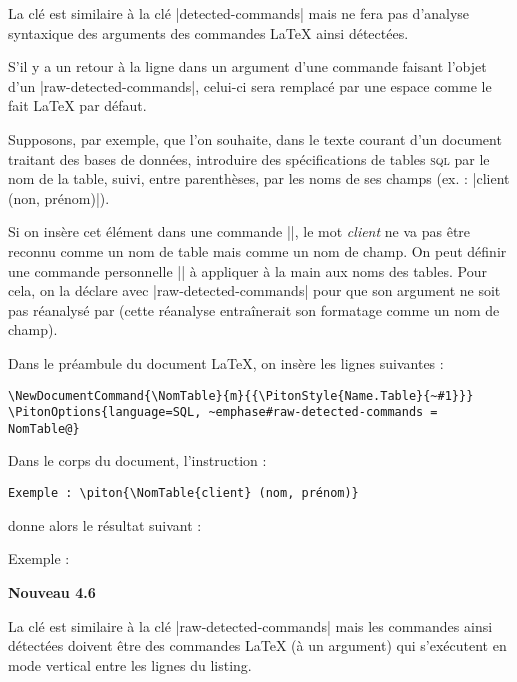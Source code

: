 \documentclass[dvipsnames,svgnames]{article}
\begin{document}
\bigskip
La clé  est similaire à la clé |detected-commands| mais
 ne fera pas d'analyse syntaxique des arguments des commandes LaTeX ainsi
détectées.

S'il y a un retour à la ligne dans un argument d'une commande faisant l'objet d'un
|raw-detected-commands|, celui-ci sera remplacé par une espace comme le fait LaTeX par
défaut. 

\medskip
Supposons, par exemple, que l'on souhaite, dans le texte courant d'un document
traitant des bases de données, introduire des spécifications de tables
\textsc{sql} par le nom de la table, suivi, entre parenthèses, par les noms de
ses champs (ex. : |client (non, prénom)|).

Si on insère cet élément dans une commande |\piton|, le mot \emph{client} ne va pas
être reconnu comme un nom de table mais comme un nom de champ. On peut définir
une commande personnelle |\NomTable|
à appliquer à la main aux noms des tables. Pour cela, on la déclare avec
|raw-detected-commands| pour que son argument ne soit pas réanalysé par 
(cette réanalyse entraînerait son formatage comme un nom de champ).


\medskip
Dans le préambule du document LaTeX, on insère les lignes suivantes :
\begin{Verbatim}
\NewDocumentCommand{\NomTable}{m}{{\PitonStyle{Name.Table}{~#1}}}
\PitonOptions{language=SQL, ~emphase#raw-detected-commands = NomTable@}
\end{Verbatim}

Dans le corps du document, l'instruction :

\begin{Verbatim}
Exemple : \piton{\NomTable{client} (nom, prénom)}
\end{Verbatim}


donne alors le résultat suivant :

\smallskip
\begingroup
{}%
Exemple : 
\endgroup


\bigskip

\colorbox{yellow!50}{\textbf{Nouveau 4.6}}

\nobreak
\smallskip
La clé  est similaire à la clé
|raw-detected-commands| mais les commandes ainsi détectées doivent être des
commandes LaTeX (à un argument) qui s'exécutent en mode vertical entre les lignes
du listing.
\end{document}
